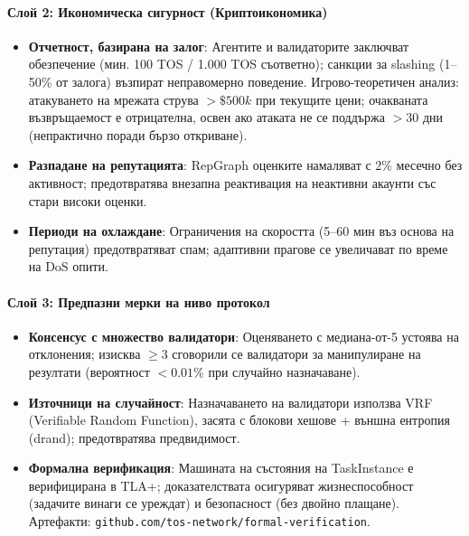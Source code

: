 \documentclass[11pt]{article}
\begin{document}
\paragraph{Слой 2: Икономическа сигурност (Криптоикономика)}
\begin{itemize}[noitemsep]
  \item \textbf{Отчетност, базирана на залог}: Агентите и валидаторите заключват обезпечение (мин. 100 TOS / 1.000 TOS съответно); санкции за slashing (1--50\% от залога) възпират неправомерно поведение. Игрово-теоретичен анализ: атакуването на мрежата струва $>\$500k$ при текущите цени; очакваната възвръщаемост е отрицателна, освен ако атаката не се поддържа $>30$ дни (непрактично поради бързо откриване).
  \item \textbf{Разпадане на репутацията}: RepGraph оценките намаляват с 2\% месечно без активност; предотвратява внезапна реактивация на неактивни акаунти със стари високи оценки.
  \item \textbf{Периоди на охлаждане}: Ограничения на скоростта (5--60 мин въз основа на репутация) предотвратяват спам; адаптивни прагове се увеличават по време на DoS опити.
\end{itemize}

\paragraph{Слой 3: Предпазни мерки на ниво протокол}
\begin{itemize}[noitemsep]
  \item \textbf{Консенсус с множество валидатори}: Оценяването с медиана-от-5 устоява на отклонения; изисква $\geq3$ сговорили се валидатори за манипулиране на резултати (вероятност $<0.01\%$ при случайно назначаване).
  \item \textbf{Източници на случайност}: Назначаването на валидатори използва VRF (Verifiable Random Function), засята с блокови хешове + външна ентропия (drand); предотвратява предвидимост.
  \item \textbf{Формална верификация}: Машината на състояния на TaskInstance е верифицирана в TLA+; доказателствата осигуряват жизнеспособност (задачите винаги се уреждат) и безопасност (без двойно плащане). Артефакти: \texttt{github.com/tos-network/formal-verification}.
\end{itemize}
\end{document}
